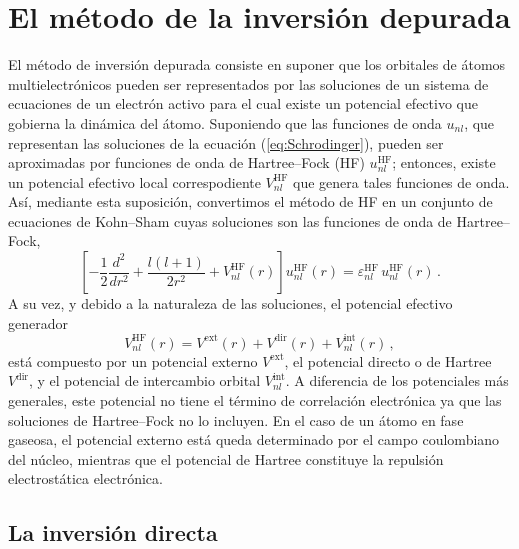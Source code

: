 \section{El método de la inversión depurada}
\label{sec:dimatomos}

El método de inversión depurada consiste en suponer que los orbitales
de átomos multielectrónicos pueden ser representados por las soluciones
de un sistema de ecuaciones de un electrón activo para el cual existe 
un potencial efectivo que gobierna la dinámica del átomo.
Suponiendo que las funciones de onda $u_{nl}$, que representan las 
soluciones de la ecuación (\ref{eq:Schrodinger}), pueden ser aproximadas 
por funciones de onda de Hartree--Fock (HF) $u_{nl}^{\mathrm{HF}}$;
entonces, existe un potencial efectivo local correspodiente 
$V_{nl}^{\mathrm{HF}}$ que genera tales funciones de onda. Así, 
mediante esta suposición, convertimos el método de HF en un conjunto 
de ecuaciones de Kohn--Sham cuyas soluciones son las funciones de 
onda de Hartree--Fock,
\begin{equation}
\left[ 
-\frac{1}{2}\frac{d^{2}}{dr^{2}} + \frac{l(l+1)}{2r^{2}} + 
V_{nl}^{\mathrm{HF}}(r) 
\right] u_{nl}^{\mathrm{HF}}(r)
   = \varepsilon_{nl}^{\mathrm{HF}}\, u_{nl}^{\mathrm{HF}}(r) \, .
\label{eq:KS}
\end{equation}
A su vez, y debido a la naturaleza de las soluciones, el potencial 
efectivo generador
\begin{equation}
V_{nl}^{\mathrm{HF}}(r) = V^{\mathrm{ext}}(r) + 
V^{\mathrm{dir}}(r) + V_{nl}^{\mathrm{int}}(r) \, ,  
\label{eq:veff}
\end{equation}
está compuesto por un potencial externo $V^{\mathrm{ext}}$, 
el potencial directo o de Hartree $V^{\mathrm{dir}}$, y el potencial
de intercambio orbital $V_{nl}^{\mathrm{int}}$. A diferencia de los
potenciales más generales, este potencial no tiene el término de 
correlación electrónica ya que las soluciones de Hartree--Fock no lo 
incluyen. En el caso de un átomo en fase gaseosa, el potencial externo 
está queda determinado por el campo coulombiano del núcleo, mientras 
que el potencial de Hartree constituye la repulsión electrostática 
electrónica. 


\subsection{La inversión directa}
\label{subsec:inversion}

